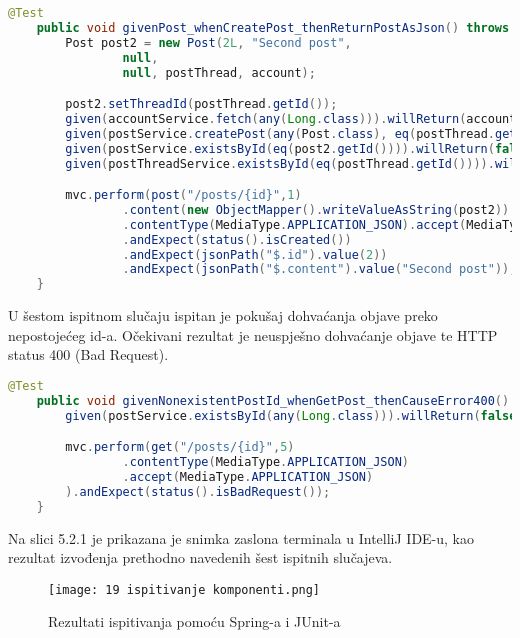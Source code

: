 			\begin{lstlisting}[language=Java, breaklines=true]
    @Test
    public void givenPost_whenCreatePost_thenReturnPostAsJson() throws Exception {
        Post post2 = new Post(2L, "Second post",
                null,
                null, postThread, account);

        post2.setThreadId(postThread.getId());
        given(accountService.fetch(any(Long.class))).willReturn(account);
        given(postService.createPost(any(Post.class), eq(postThread.getId()))).willReturn(post2);
        given(postService.existsById(eq(post2.getId()))).willReturn(false);
        given(postThreadService.existsById(eq(postThread.getId()))).willReturn(true);

        mvc.perform(post("/posts/{id}",1)
                .content(new ObjectMapper().writeValueAsString(post2))
                .contentType(MediaType.APPLICATION_JSON).accept(MediaType.APPLICATION_JSON))
                .andExpect(status().isCreated())
                .andExpect(jsonPath("$.id").value(2))
                .andExpect(jsonPath("$.content").value("Second post"));
    }
			\end{lstlisting}

			U šestom ispitnom slučaju ispitan je pokušaj dohvaćanja objave preko nepostojećeg id-a.
			Očekivani rezultat je neuspješno dohvaćanje objave te HTTP status 400 (Bad Request).

			\begin{lstlisting}[language=Java, breaklines=true]
    @Test
    public void givenNonexistentPostId_whenGetPost_thenCauseError400() throws Exception {
        given(postService.existsById(any(Long.class))).willReturn(false);

        mvc.perform(get("/posts/{id}",5)
                .contentType(MediaType.APPLICATION_JSON)
                .accept(MediaType.APPLICATION_JSON)
        ).andExpect(status().isBadRequest());
    }
			\end{lstlisting}

			Na slici 5.2.1 je prikazana je snimka zaslona terminala u IntelliJ IDE-u, kao rezultat izvođenja prethodno navedenih šest ispitnih slučajeva.

			\begin{figure}[H]
					\centering
					\texttt{[image: 19 ispitivanje komponenti.png]}
					\caption{Rezultati ispitivanja pomoću Spring-a i JUnit-a}
				\end{figure}
			\eject


